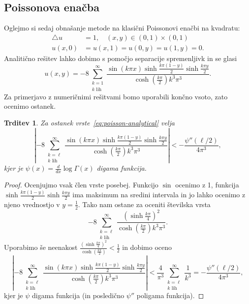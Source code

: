 \documentclass[12pt,a4paper,twoside]{article}
\theoremstyle{definition} %
\theoremstyle{plain} %
\newtheorem{trditev}[definicija]{Trditev}
\numberwithin{equation}{section}
\newcommand{\lap}{\triangle}
\newcommand{\dd}[2]{\ensuremath{\frac{d #1}{d #2}}}
\newcommand{\ddx}[1]{\dd{#1}{x}}
\begin{document}
\subsection{Poissonova enačba}
Oglejmo si sedaj obnašanje metode na klasični Poissonovi enačbi na kvadratu:
\begin{align}
  \lap u &= 1, \quad (x, y) \in (0, 1) \times (0, 1)
  \label{eq:poisson-problem} \\
  u(x, 0) &= u(x, 1) = u(0, y) = u(1, y) = 0. \nonumber
\end{align}
Analitično rešitev lahko dobimo s pomočjo separacije spremenljivk in se glasi
\begin{equation}
  u(x, y) =
  -8 \sum_{\substack{k=1 \\ k \text{ lih}}}^\infty \frac{ \sin (k \pi  x) \sinh
  \frac{k \pi  (1-y)}{2} \sinh \frac{k \pi
y}{2}}{\cosh(\frac{k\pi}{2})k^3 \pi ^3}.
  \label{eq:poisson-analytical}
\end{equation}
Za primerjavo z numeričnimi rešitvami bomo uporabili končno vsoto, zato ocenimo
ostanek.
\begin{trditev}
  Za ostanek vrste~\eqref{eq:poisson-analytical} velja
  \[
    \left|-8 \sum_{\substack{k=\ell \\ k \text{ lih}}}^\infty \frac{ \sin (k \pi  x) \sinh
      \frac{k \pi  (1-y)}{2} \sinh \frac{k \pi y}{2}}{\cosh(\frac{k\pi}{2})k^3
      \pi ^3}\right| < -\frac{\psi''(\ell/2)}{4 \pi^3},
  \]
  kjer je $\psi(x) = \ddx{}\log\Gamma(x)$ digama funkcija.
\end{trditev}
\begin{proof}
Ocenjujmo vsak člen vrste posebej. Funkcijo $\sin$ ocenimo z 1, funkcija
$\sinh \frac{k \pi  (1-y)}{2} \sinh \frac{k \pi y}{2}$ ima maksimum na sredini
intervala in jo lahko ocenimo z njeno vrednostjo v $y = \frac{1}{2}$.
Tako nam ostane za oceniti številska vrsta
\[
    -8 \sum_{\substack{k=\ell \\ k \text{ lih}}}^\infty
    \frac{\left(\sinh\frac{k \pi}{4}\right)^2}{\cosh(\frac{k\pi}{2})k^3
    \pi ^3} .
\]
Uporabimo še neenakost $\frac{\left(\sinh\frac{k
\pi}{4}\right)^2}{\cosh(\frac{k\pi}{2})} < \frac{1}{2}$ in dobimo oceno
\[
\left|-8 \sum_{\substack{k=\ell \\ k \text{ lih}}}^\infty \frac{ \sin (k \pi  x) \sinh
      \frac{k \pi  (1-y)}{2} \sinh \frac{k \pi y}{2}}{\cosh(\frac{k\pi}{2})k^3
      \pi ^3}\right| < \frac{4}{\pi^3} \sum_{\substack{k=\ell \\ k \text{ lih}}}^\infty
      \frac{1}{k^3} = -\frac{\psi''(\ell/2)}{4 \pi^3},
\]
kjer je $\psi$ digama funkcija (in posledično $\psi''$ poligama funkcija).
\end{proof}
\end{document}
